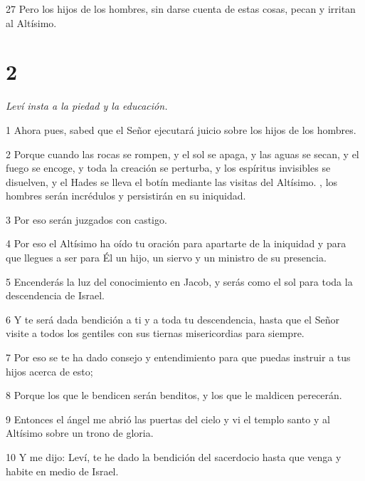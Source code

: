 \par 27 Pero los hijos de los hombres, sin darse cuenta de estas cosas, pecan y irritan al Altísimo.

\chapter{2}

\par \textit{Leví insta a la piedad y la educación.}

\par 1 Ahora pues, sabed que el Señor ejecutará juicio sobre los hijos de los hombres.

\par 2 Porque cuando las rocas se rompen, y el sol se apaga, y las aguas se secan, y el fuego se encoge, y toda la creación se perturba, y los espíritus invisibles se disuelven, y el Hades se lleva el botín mediante las visitas del Altísimo. , los hombres serán incrédulos y persistirán en su iniquidad.

\par 3 Por eso serán juzgados con castigo.

\par 4 Por eso el Altísimo ha oído tu oración para apartarte de la iniquidad y para que llegues a ser para Él un hijo, un siervo y un ministro de su presencia.

\par 5 Encenderás la luz del conocimiento en Jacob, y serás como el sol para toda la descendencia de Israel.

\par 6 Y te será dada bendición a ti y a toda tu descendencia, hasta que el Señor visite a todos los gentiles con sus tiernas misericordias para siempre.

\par 7 Por eso se te ha dado consejo y entendimiento para que puedas instruir a tus hijos acerca de esto;

\par 8 Porque los que le bendicen serán benditos, y los que le maldicen perecerán.

\par 9 Entonces el ángel me abrió las puertas del cielo y vi el templo santo y al Altísimo sobre un trono de gloria.

\par 10 Y me dijo: Leví, te he dado la bendición del sacerdocio hasta que venga y habite en medio de Israel.

